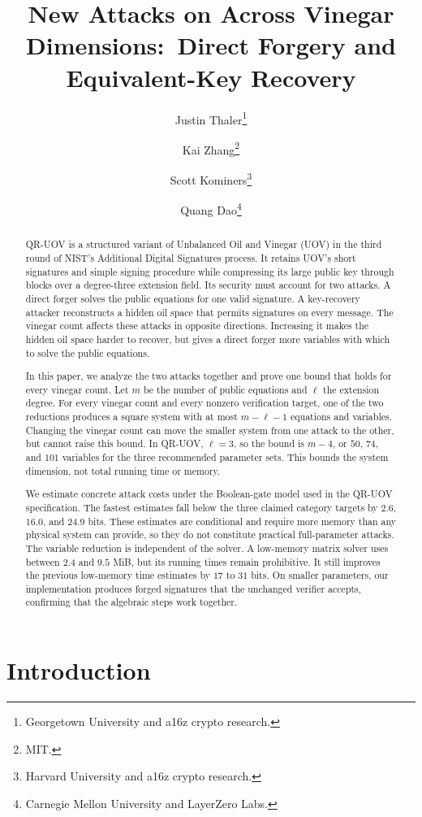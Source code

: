 \documentclass[11pt,a4paper]{article}
\title{\bfseries New Attacks on \QRUOV{} Across Vinegar Dimensions:\ Direct Forgery and Equivalent-Key Recovery}
\author{Justin Thaler\thanks{Georgetown University and a16z crypto research.}
\and Kai Zhang\thanks{MIT.}
\and Scott Kominers\thanks{Harvard University and a16z crypto research.}
\and Quang Dao\thanks{Carnegie Mellon University and LayerZero Labs.}}
\theoremstyle{definition}
\theoremstyle{remark}
\newcommand{\QRUOV}{\textsf{QR-UOV}}
\begin{document}
\maketitle

\begin{abstract}
\QRUOV{} is a structured variant of Unbalanced Oil and Vinegar (UOV) in the
third round of NIST's Additional Digital Signatures process.  It retains UOV's
short signatures and simple signing procedure while compressing its large
public key through blocks over a degree-three extension field.  Its security
must account for two attacks.  A direct forger solves the public equations for
one valid signature.  A key-recovery attacker reconstructs a hidden oil space
that permits signatures on every message.  The vinegar count affects these
attacks in opposite directions.  Increasing it makes the hidden oil space
harder to recover, but gives a direct forger more variables with which to
solve the public equations.

In this paper, we analyze the two attacks together and prove one bound that
holds for every vinegar count.  Let $m$ be the number of public equations and
$\ell$ the extension degree.  For every vinegar count and every nonzero
verification target, one of the two reductions produces a square system with
at most $m-\ell-1$ equations and variables.  Changing the vinegar count can
move the smaller system from one attack to the other, but cannot raise this
bound.  In \QRUOV{}, $\ell=3$, so the bound is $m-4$, or $50$, $74$, and $101$
variables for the three recommended parameter sets.  This bounds the system
dimension, not total running time or memory.

We estimate concrete attack costs under the Boolean-gate model used in the
\QRUOV{} specification.  The fastest estimates fall below the three claimed
category targets by $2.6$, $16.0$, and $24.9$ bits.  These estimates are
conditional and require more memory than any physical system can provide, so
they do not constitute practical full-parameter attacks.  The variable
reduction is independent of the solver.  A low-memory matrix solver uses
between $2.4$ and $9.5$ MiB, but its running times remain prohibitive.  It
still improves the previous low-memory time estimates by $17$ to $31$ bits.
On smaller parameters, our implementation produces forged signatures that the
unchanged verifier accepts, confirming that the algebraic steps work together.
\end{abstract}

\section{Introduction}\label{sec:intro}
\end{document}
